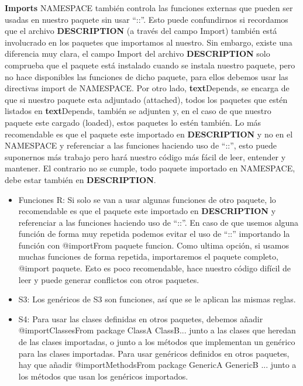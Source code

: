 \textbf{Imports}
NAMESPACE tambi\'en controla las funciones externas que pueden ser usadas en nuestro
paquete sin usar “::”. Esto puede confundirnos si recordamos que el archivo \textbf{DESCRIPTION}
(a trav\'es del campo Import) tambi\'en est\'a involucrado en los paquetes que importamos al
nuestro. Sin embargo, existe una diferencia muy clara, el campo Import del archivo
\textbf{DESCRIPTION} solo comprueba que el paquete est\'a instalado cuando se instala nuestro
paquete, pero no hace disponibles las funciones de dicho paquete, para ellos debemos usar
las directivas import de NAMESPACE.
Por otro lado, \textbf{text}{Depends}, se encarga de que si nuestro paquete esta adjuntado (attached),
todos los paquetes que est\'en listados en \textbf{text}{Depends}, tambi\'en se adjunten y, en el caso de que
nuestro paquete este cargado (loaded), estos paquetes lo est\'en tambi\'en.
Lo m\'as recomendable es que el paquete este importado en \textbf{DESCRIPTION} y no en el
NAMESPACE y referenciar a las funciones haciendo uso de “::”, esto puede suponernos m\'as
trabajo pero har\'a nuestro c\'odigo m\'as f\'acil de leer, entender y mantener. El contrario no se
cumple, todo paquete importado en NAMESPACE, debe estar tambi\'en en \textbf{DESCRIPTION}.

\begin{itemize}
    \item Funciones R:
Si solo se van a usar algunas funciones de otro paquete, lo recomendable es que el
paquete este importado en \textbf{DESCRIPTION} y referenciar a las funciones haciendo uso
de “::”.
En caso de que usemos alguna funci\'on de forma muy repetida podemos evitar el uso
de “::” importando la funci\'on con @importFrom paquete funcion.
Como ultima opci\'on, si usamos muchas funciones de forma repetida, importaremos el
paquete completo, @import paquete. Esto es poco recomendable, hace nuestro
c\'odigo dif\'icil de leer y puede generar conflictos con otros paquetes.
    \item S3:
Los gen\'ericos de S3 son funciones, as\'i que se le aplican las mismas reglas.
    \item S4:
Para usar las clases definidas en otros paquetes, debemos a\~nadir
@importClassesFrom package ClassA ClassB... junto a las clases que heredan de
las clases importadas, o junto a los m\'etodos que implementan un gen\'erico para las
clases importadas.
Para usar gen\'ericos definidos en otros paquetes, hay que a\~nadir
@importMethodsFrom package GenericA GenericB ... junto a los m\'etodos que usan
los gen\'ericos importados.
\end{itemize}

